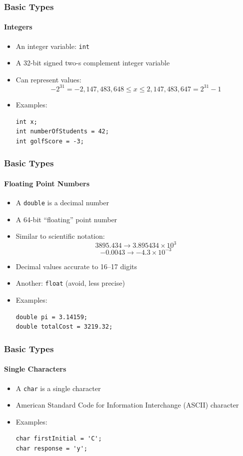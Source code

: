 \documentclass[]{beamer}
\begin{document}
\begin{frame}[fragile]
    \frametitle{Basic Types}
    \framesubtitle{Integers}

\begin{itemize}[<+->]
  \item An integer variable: \texttt{int}
  \item A 32-bit signed two-s complement integer variable
  \item Can represent values:
    $$-2^{31} = -2,147,483,648 \leq x \leq 2,147,483,647 = 2^{31} - 1$$
  \item Examples:
\begin{verbatim}
int x;
int numberOfStudents = 42;
int golfScore = -3;
\end{verbatim}
\end{itemize}

\end{frame}

\begin{frame}[fragile]
    \frametitle{Basic Types}
    \framesubtitle{Floating Point Numbers}

\begin{itemize}[<+->]
  \item A \texttt{double} is a decimal number
  \item A 64-bit ``floating'' point number
  \item Similar to scientific notation:
  $$3895.434 \rightarrow 3.895434 \times 10^{3}$$
  $$-0.0043 \rightarrow -4.3 \times 10^{-3}$$
  \item Decimal values accurate to 16--17 digits %
  \item Another: \texttt{float} (avoid, less precise)
  \item Examples:
\begin{verbatim}
double pi = 3.14159;
double totalCost = 3219.32;
\end{verbatim}
\end{itemize}

\end{frame}

\begin{frame}[fragile]
    \frametitle{Basic Types}
    \framesubtitle{Single Characters}

\begin{itemize}[<+->]
  \item A \texttt{char} is a single character
  \item American Standard Code for Information Interchange (ASCII) character %
  \item Examples:
\begin{verbatim}
char firstInitial = 'C';
char response = 'y';
\end{verbatim}
\end{itemize}

\end{frame}
\end{document}
